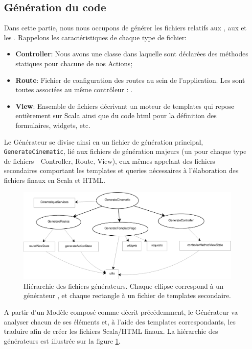 \subsection{Génération du code}
Dans cette partie, nous nous occupons de générer les fichiers relatifs aux , aux  et les . Rappelons les caractéristiques de chaque type de fichier:
\begin{itemize}
\item \textbf{Controller}: Nous avons une classe  dans laquelle sont déclarées des méthodes statiques pour chacune de nos Actions;
\item \textbf{Route}: Fichier de configuration des routes au sein de l'application. Les  sont toutes associées au même contrôleur : . 
\item \textbf{View}: Ensemble de fichiers décrivant un moteur de templates qui repose entièrement sur Scala ainsi que du code html pour la définition des formulaires, widgets, etc. 
\end{itemize}
Le Générateur  se divise ainsi en un fichier de génération principal, \verb+GenerateCinematic+, lié aux fichiers de génération majeurs (un pour chaque type de fichiers - Controller, Route, View), eux-mêmes appelant des fichiers secondaires comportant les templates et queries nécessaires à l'élaboration des fichiers finaux en Scala et HTML.
\begin{figure}[H]
  \centering
  \includegraphics[scale=.35]{img/hierarchie.eps}
  \caption{Hiérarchie des fichiers générateurs. Chaque ellipse correspond à un générateur , et chaque rectangle à un fichier de templates secondaire.}
  \label{fig:gen}
\end{figure}
A partir d'un Modèle composé comme décrit précédemment, le Générateur va analyser chacun de ses éléments et, à l'aide des templates correspondants, les traduire afin de créer les fichiers Scala/HTML finaux. La hiérarchie des générateurs est illustrée sur la figure \ref{fig:gen}.


